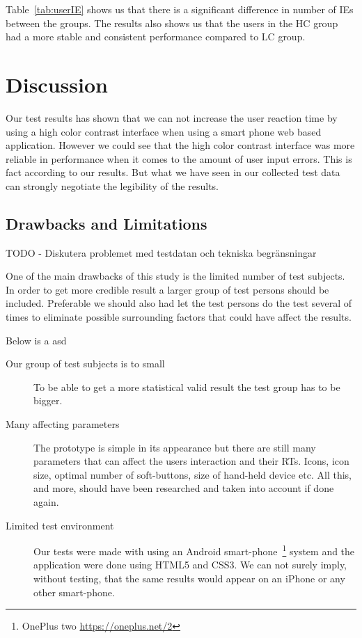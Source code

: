 \documentclass[runningheads,a4paper]{llncs}
\begin{document}
Table~\ref{tab:userIE} shows us that there is a significant difference in number of IEs between the groups. The results also shows us that the users in the HC group had a more stable and consistent performance compared to LC group.

\section{Discussion} \label{sec:discussion}
Our test results has shown that we can not increase the user reaction time by using a high color contrast interface when using a smart phone web based application. However we could see that the high color contrast interface was more reliable in performance when it comes to the amount of user input errors. This is fact according to our results. But what we have seen in our collected test data can strongly negotiate the legibility of the results.

\subsection{Drawbacks and Limitations} \label{subsec:drawbacks}
TODO
	- Diskutera problemet med testdatan och tekniska begränsningar

One of the main drawbacks of this study is the limited number of test subjects. In order to get more credible result a larger group of test persons should be included. Preferable we should also had let the test persons do the test several of times to eliminate possible surrounding factors that could have affect the results. 

Below is a asd
\begin{description}
	\item[Our group of test subjects is to small] To be able to get a more statistical valid result the test group has to be bigger.
	\item[Many affecting parameters] The prototype is simple in its appearance but there are still many parameters that can affect the users interaction and their RTs. Icons, icon size, optimal number of soft-buttons, size of hand-held device etc. All this, and more, should have been researched and taken into account if done again. 
	\item[Limited test environment] Our tests were made with using an Android smart-phone~\footnote{OnePlus two \url{https://oneplus.net/2}} system and the application were done using HTML5 and CSS3. We can not surely imply, without testing, that the same results would appear on an iPhone or any other smart-phone.
\end{description}
\end{document}
